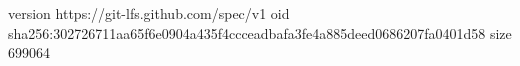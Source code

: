 version https://git-lfs.github.com/spec/v1
oid sha256:302726711aa65f6e0904a435f4ccceadbafa3fe4a885deed0686207fa0401d58
size 699064
